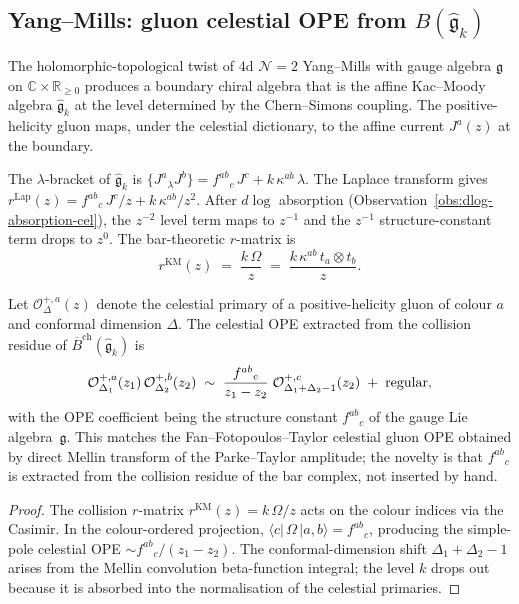 \documentclass[11pt]{article}
\newcommand{\cN}{\mathcal{N}}
\newcommand{\cO}{\mathcal{O}}
\newcommand{\fg}{\mathfrak{g}}
\newcommand{\barB}{\overline{B}}
\newcommand{\C}{\mathbb{C}}
\newcommand{\R}{\mathbb{R}}
\begin{document}
\subsection{Yang--Mills: gluon celestial OPE from $B(\widehat{\fg}_k)$}
\label{subsec:gluon-celestial-ope-cel}

The holomorphic-topological twist of $4$d $\cN = 2$ Yang--Mills with
gauge algebra $\fg$ on $\C \times \R_{\ge 0}$ produces a boundary
chiral algebra that is the affine Kac--Moody algebra
$\widehat{\fg}_k$ at the level determined by the Chern--Simons
coupling.  The positive-helicity gluon maps, under the celestial
dictionary, to the affine current $J^a(z)$ at the boundary.

The $\lambda$-bracket of $\widehat{\fg}_k$ is
$\{J^a {}_\lambda J^b\} = f^{ab}{}_c\, J^c + k\, \kappa^{ab}\, \lambda$.
The Laplace transform gives
$r^{\mathrm{Lap}}(z) = f^{ab}{}_c\, J^c / z + k\, \kappa^{ab} / z^2$.
After $d\log$ absorption (Observation~\ref{obs:dlog-absorption-cel}),
the $z^{-2}$ level term maps to $z^{-1}$ and the $z^{-1}$
structure-constant term drops to $z^0$.  The bar-theoretic $r$-matrix is
\[
r^{\mathrm{KM}}(z)
\;=\; \frac{k\, \Omega}{z}
\;=\; \frac{k\, \kappa^{ab}\, t_a \otimes t_b}{z}.
\]

\begin{theorem}
\label{thm:celestial-gluon-ope-cel}
Let $\cO^{+,a}_{\Delta}(z)$ denote the celestial primary of a
positive-helicity gluon of colour $a$ and conformal dimension $\Delta$.
The celestial OPE extracted from the collision residue of
$\barB^{\mathrm{ch}}(\widehat{\fg}_k)$ is
\[
\cO^{+,a}_{\Delta_1}(z_1)\,\cO^{+,b}_{\Delta_2}(z_2)
\;\sim\;
\frac{f^{ab}{}_c}{z_1 - z_2}\;
\cO^{+,c}_{\Delta_1 + \Delta_2 - 1}(z_2)
\;+\; \textup{regular},
\]
with the OPE coefficient being the structure constant $f^{ab}{}_c$
of the gauge Lie algebra~$\fg$.  This matches the Fan--Fotopoulos--Taylor
celestial gluon OPE obtained by direct Mellin transform of the
Parke--Taylor amplitude; the novelty is that $f^{ab}{}_c$ is extracted
from the collision residue of the bar complex, not inserted by hand.
\end{theorem}

\begin{proof}
The collision $r$-matrix $r^{\mathrm{KM}}(z) = k\,\Omega/z$ acts on
the colour indices via the Casimir.  In the colour-ordered projection,
$\langle c| \,\Omega\, |a,b\rangle = f^{ab}{}_c$, producing the
simple-pole celestial OPE $\sim f^{ab}{}_c / (z_1 - z_2)$.
The conformal-dimension shift $\Delta_1 + \Delta_2 - 1$ arises from
the Mellin convolution beta-function integral; the level $k$ drops out
because it is absorbed into the normalisation of the celestial primaries.
\end{proof}
\end{document}

